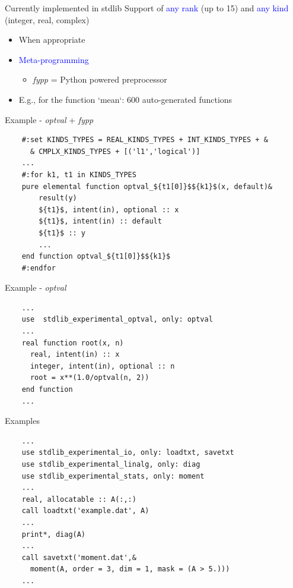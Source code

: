 \documentclass{beamer}
\begin{document}
\begin{frame}[c]{Currently implemented in stdlib}
	Support of \textcolor{blue}{any rank} (up to 15) and \textcolor{blue}{any kind}
	(\textcolor{mygreen}{integer}, \textcolor{mygreen}{real}, \textcolor{mygreen}{complex})
	\begin{itemize}
		\item When appropriate
		\item \textcolor{blue}{Meta-programming}
		\begin{itemize}
			\item \textit{fypp} = Python powered preprocessor
		\end{itemize}
		\item E.g., for the function `mean`: 600 auto-generated functions
	\end{itemize}
\end{frame}

\begin{frame}[fragile]{Example - \textit{optval} + \textit{fypp}}
	
	\begin{lstlisting}
	#:set KINDS_TYPES = REAL_KINDS_TYPES + INT_KINDS_TYPES + &
	  & CMPLX_KINDS_TYPES + [('l1','logical')]
	...
	#:for k1, t1 in KINDS_TYPES
	pure elemental function optval_${t1[0]}$${k1}$(x, default)&
	    result(y)
	    ${t1}$, intent(in), optional :: x
	    ${t1}$, intent(in) :: default
	    ${t1}$ :: y
	    ...
	end function optval_${t1[0]}$${k1}$
	#:endfor\end{lstlisting}

\end{frame}


\begin{frame}[fragile]{Example - \textit{optval}}
	\begin{lstlisting}
	...
	use  stdlib_experimental_optval, only: optval
	...
	real function root(x, n)
	  real, intent(in) :: x
	  integer, intent(in), optional :: n
	  root = x**(1.0/optval(n, 2))
	end function
	...	\end{lstlisting}
\end{frame}


\begin{frame}[fragile]{Examples}
	\begin{lstlisting}
	...
	use stdlib_experimental_io, only: loadtxt, savetxt
	use stdlib_experimental_linalg, only: diag
	use stdlib_experimental_stats, only: moment
	...
	real, allocatable :: A(:,:)
	call loadtxt('example.dat', A)
	...
	print*, diag(A)
	...
 	call savetxt('moment.dat',&
	  moment(A, order = 3, dim = 1, mask = (A > 5.)))
	...	\end{lstlisting}
\end{frame}
\end{document}
